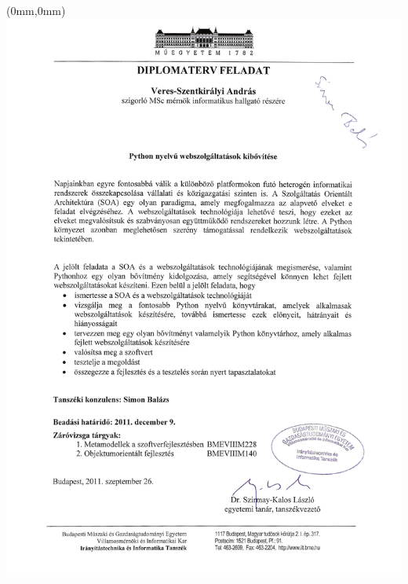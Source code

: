  \begin{textblock*}{\paperwidth}(0mm,0mm)
    \noindent\includegraphics[width=\paperwidth,height=\paperheight]{images/feladat-retouched.jpg}
	\end{textblock*}
	\mbox{}
 \blankpage

